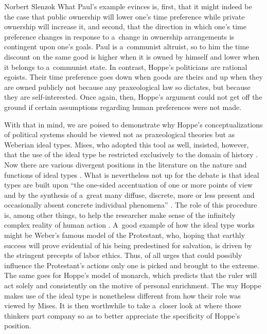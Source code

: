 \begin{artengenv}{Norbert Slenzok}
What Paul's example evinces is, first, that it might indeed be the case that public ownership will lower one's time preference while private ownership will increase it, and second, that the direction in which one's time preference changes in response to a~change in ownership arrangements is contingent upon one's goals. Paul is a~communist altruist, so to him the time discount on the same good is higher when it is owned by himself and lower when it belongs to a~communist state. In contrast, Hoppe's politicians are rational egoists. Their time preference goes down when goods are theirs and up when they are owned publicly not because any praxeological law so dictates, but because they are self-interested. Once again, then, Hoppe's argument could not get off the ground if certain assumptions regarding human preferences were not made.



With that in mind, we are poised to demonstrate why Hoppe's conceptualizations of political systems should be viewed not as praxeological theories but as Weberian ideal types. Mises, who adopted this tool as well, insisted, however, that the use of the ideal type be restricted exclusively to the domain of history 
\parencites[][pp.59–64]{mises_human_1998}[][pp.315–322]{mises_theory_2007}. %
 Now there are various divergent positions in the literature on the nature and functions of ideal types 
\parencite[see][pp.35–119]{kuninski_myslenie_1980}. %
 What is nevertheless not up for the debate is that ideal types are built upon ``the one-sided accentuation of one or more points of view and by the synthesis of a~great many diffuse, discrete, more or less present and occasionally absent concrete individual phenomena'' 
\parencites[][p.90]{weber_methodology_1949}[see also][pp.315–320]{mises_theory_2007}. %
 The role of this procedure is, among other things, to help the researcher make sense of the infinitely complex reality of human action 
\parencite[][p.320]{mises_theory_2007}. %
 A~good example of how the ideal type works might be Weber's 
\parencite*[][]{weber_protestant_2001} %
 famous model of the Protestant, who, hoping that earthly success will prove evidential of his being predestined for salvation, is driven by the stringent precepts of labor ethics. Thus, of all urges that could possibly influence the Protestant's actions only one is picked and brought to the extreme. The same goes for Hoppe's model of monarch, which predicts that the ruler will act solely and consistently on the motive of personal enrichment. The way Hoppe makes use of the ideal type is nonetheless different from how their role was viewed by Mises. It is then worthwhile to take a~closer look at where those thinkers part company so as to better appreciate the specificity of Hoppe's position.




\end{artengenv}
